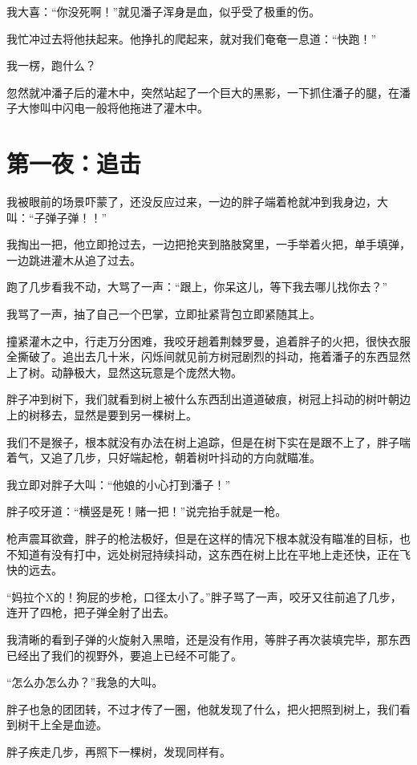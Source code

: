 我大喜：“你没死啊！”就见潘子浑身是血，似乎受了极重的伤。

我忙冲过去将他扶起来。他挣扎的爬起来，就对我们奄奄一息道：“快跑！”

我一楞，跑什么？

忽然就冲潘子后的灌木中，突然站起了一个巨大的黑影，一下抓住潘子的腿，在潘子大惨叫中闪电一般将他拖进了灌木中。

\chapter{第一夜：追击}

我被眼前的场景吓蒙了，还没反应过来，一边的胖子端着枪就冲到我身边，大叫：“子弹子弹！！”

我掏出一把，他立即抢过去，一边把抢夹到胳肢窝里，一手举着火把，单手填弹，一边跳进灌木从追了过去。

跑了几步看我不动，大骂了一声：“跟上，你呆这儿，等下我去哪儿找你去？”

我骂了一声，抽了自己一个巴掌，立即扯紧背包立即紧随其上。

撞紧灌木之中，行走万分困难，我咬牙趟着荆棘罗曼，追着胖子的火把，很快衣服全撕破了。追出去几十米，闪烁间就见前方树冠剧烈的抖动，拖着潘子的东西显然上了树。动静极大，显然这玩意是个庞然大物。

胖子冲到树下，我们就看到树上被什么东西刮出道道破痕，树冠上抖动的树叶朝边上的树移去，显然是要到另一棵树上。

我们不是猴子，根本就没有办法在树上追踪，但是在树下实在是跟不上了，胖子喘着气，又追了几步，只好端起枪，朝着树叶抖动的方向就瞄准。

我立即对胖子大叫：“他娘的小心打到潘子！”

胖子咬牙道：“横竖是死！赌一把！”说完抬手就是一枪。

枪声震耳欲聋，胖子的枪法极好，但是在这样的情况下根本就没有瞄准的目标，也不知道有没有打中，远处树冠持续抖动，这东西在树上比在平地上走还快，正在飞快的远去。

“妈拉个X的！狗屁的步枪，口径太小了。”胖子骂了一声，咬牙又往前追了几步，连开了四枪，把子弹全射了出去。

我清晰的看到子弹的火旋射入黑暗，还是没有作用，等胖子再次装填完毕，那东西已经出了我们的视野外，要追上已经不可能了。

“怎么办怎么办？”我急的大叫。

胖子也急的团团转，不过才传了一圈，他就发现了什么，把火把照到树上，我们看到树干上全是血迹。

胖子疾走几步，再照下一棵树，发现同样有。

